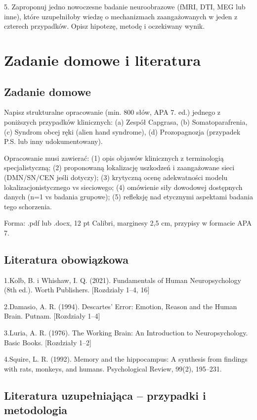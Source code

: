 \documentclass[11pt,a4paper]{article}
\begin{document}
5. Zaproponuj jedno nowoczesne badanie neuroobrazowe (fMRI, DTI, MEG lub inne), które uzupełniłoby wiedzę o mechanizmach zaangażowanych w jeden z czterech przypadków. Opisz hipotezę, metodę i oczekiwany wynik.

\section{Zadanie domowe i literatura}

\subsection*{Zadanie domowe}

Napisz strukturalne opracowanie (min. 800 słów, APA 7. ed.) jednego z poniższych przypadków klinicznych:
(a) Zespół Capgrasa,
(b) Somatoparafrenia,
(c) Syndrom obcej ręki (alien hand syndrome),
(d) Prozopagnozja (przypadek P.S. lub inny udokumentowany).

Opracowanie musi zawierać:
(1) opis objawów klinicznych z terminologią specjalistyczną;
(2) proponowaną lokalizację uszkodzeń i zaangażowane sieci (DMN/SN/CEN jeśli dotyczy);
(3) krytyczną ocenę adekwatności modelu lokalizacjonistycznego vs sieciowego;
(4) omówienie siły dowodowej dostępnych danych (n=1 vs badania grupowe);
(5) refleksję nad etycznymi aspektami badania tego schorzenia.

Forma: .pdf lub .docx, 12 pt Calibri, marginesy 2,5 cm, przypisy w formacie APA 7.

\subsection{Literatura obowiązkowa}

1.Kolb, B. i Whishaw, I. Q. (2021). Fundamentals of Human Neuropsychology (8th ed.). Worth Publishers.
[Rozdziały 1–4, 16]

2.Damasio, A. R. (1994). Descartes' Error: Emotion, Reason and the Human Brain. Putnam. [Rozdziały 1–4]

3.Luria, A. R. (1976). The Working Brain: An Introduction to Neuropsychology. Basic Books. [Rozdziały 1–2]

4.Squire, L. R. (1992). Memory and the hippocampus: A synthesis from findings with rats, monkeys, and humans. Psychological Review, 99(2), 195–231.

\subsection{Literatura uzupełniająca – przypadki i metodologia}
\end{document}
